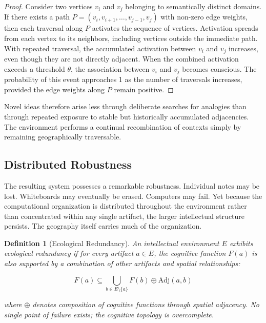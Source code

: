 \documentclass[12pt,oneside]{article}
\newtheorem{definition}{Definition}[section]
\theoremstyle{remark}
\begin{document}
\begin{proof}
Consider two vertices $v_i$ and $v_j$ belonging to semantically distinct domains. If there exists a path $P = (v_i, v_{i+1}, \ldots, v_{j-1}, v_j)$ with non-zero edge weights, then each traversal along $P$ activates the sequence of vertices. Activation spreads from each vertex to its neighbors, including vertices outside the immediate path. With repeated traversal, the accumulated activation between $v_i$ and $v_j$ increases, even though they are not directly adjacent. When the combined activation exceeds a threshold $\theta$, the association between $v_i$ and $v_j$ becomes conscious. The probability of this event approaches 1 as the number of traversals increases, provided the edge weights along $P$ remain positive.
\end{proof}

Novel ideas therefore arise less through deliberate searches for analogies than through repeated exposure to stable but historically accumulated adjacencies. The environment performs a continual recombination of contexts simply by remaining geographically traversable.

\subsection{Distributed Robustness}

The resulting system possesses a remarkable robustness. Individual notes may be lost. Whiteboards may eventually be erased. Computers may fail. Yet because the computational organization is distributed throughout the environment rather than concentrated within any single artifact, the larger intellectual structure persists. The geography itself carries much of the organization.

\begin{definition}[Ecological Redundancy]
An intellectual environment $E$ exhibits ecological redundancy if for every artifact $a \in E$, the cognitive function $F(a)$ is also supported by a combination of other artifacts and spatial relationships:

\begin{equation}
F(a) \subseteq \bigcup_{b \in E \setminus \{a\}} F(b) \oplus \text{Adj}(a, b)
\end{equation}

where $\oplus$ denotes composition of cognitive functions through spatial adjacency. No single point of failure exists; the cognitive topology is overcomplete.
\end{definition}
\end{document}
